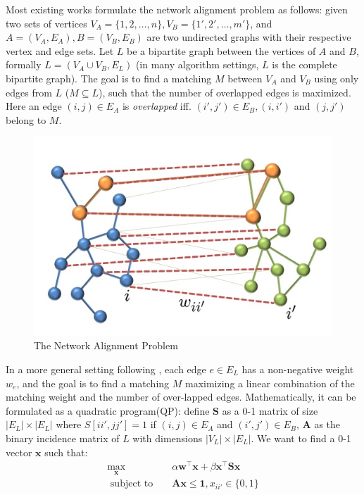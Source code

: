 \documentclass[11pt,letterpaper]{article}
\begin{document}
Most existing works formulate the network alignment problem as follows: given two sets of vertices $V_A = \{1, 2, \ldots, n\}, V_B = \{1', 2', \ldots, m'\}$, and $A = (V_A, E_A), B = (V_B, E_B)$ are two undirected graphs with their respective vertex and edge sets. Let $L$ be a bipartite graph between the vertices of $A$ and $B$, formally $L = (V_A \cup V_B, E_L)$ (in many algorithm settings, $L$ is the complete bipartite graph). The goal is to find a matching $M$ between $V_A$ and $V_B$ using only edges from $L$ ($M \subseteq L$), such that the number of overlapped edges is maximized. Here an edge $(i, j) \in E_A$ is \textit{overlapped} iff. $(i', j') \in E_B, (i, i')$ and $(j, j')$ belong to $M$.


\begin{figure}[!h]
\begin{center}
\includegraphics[scale = 0.5]{fig/matching}
\caption{The Network Alignment Problem}
\end{center}
\end{figure}

In a more general setting following \cite{Singh2007}, each edge $e \in E_L$ has a non-negative weight $w_e$, and the goal is to find a matching $M$ maximizing a linear combination of the matching weight and the number of over-lapped edges. Mathematically, it can be formulated as a quadratic program(QP): define $\mathbf{S}$ as a 0-1 matrix of size $|E_L| \times |E_L|$ where $S[ii',  jj'] = 1$ if $(i, j) \in E_A$ and $(i', j') \in E_B$, $\mathbf{A}$ as the binary incidence matrix of $L$ with dimensions $|V_L| \times |E_L|$. We want to find a 0-1 vector $\mathbf{x}$ such that:
\begin{eqnarray*}
		\max_{\mathbf{x}} & & {\alpha \mathbf{w}^{\intercal}\mathbf{x} + \beta \mathbf{x}^{\intercal}\mathbf{S}\mathbf{x}} \\
		\text{ subject to  } & &  \mathbf{A}\mathbf{x} \leq \mathbf{1}, x_{ii'} \in \{0, 1\}
\end{eqnarray*}
\end{document}
